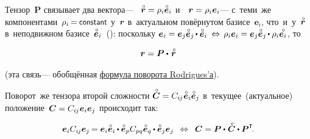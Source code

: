 \begin{otherlanguage}{russian}
\vspace{-0.4em}
Тензор~$\bm{P}$ связывает два вектора\:--- ~${\initiallocationvector = \rho_i \mathcircabove{\bm{e}}_i}$ и~~${\bm{r} = \rho_i \bm{e}_i}$\:--- с~теми~же компонентами~${\rho_i \hspace{-0.2ex} = \hspace{-0.1ex} \constant}$ у~$\bm{r}$ в~актуальном повёрнутом базисе~${\bm{e}_i}$, что~и~у~${\initiallocationvector}$ в~неподвижном базисе~${\mathcircabove{\bm{e}}_i}$~():
поскольку ${\bm{e}_i = \bm{e}_j \mathcircabove{\bm{e}}_j \hspace{-0.15ex} \dotp \mathcircabove{\bm{e}}_i \:\Leftrightarrow\, \rho_i \bm{e}_i = \bm{e}_j \mathcircabove{\bm{e}}_j \hspace{-0.15ex} \dotp \rho_i \mathcircabove{\bm{e}_i}}$, то

\nopagebreak\vspace{-0.25em}\begin{equation}\label{rodriguesrotationformula}
\locationvector = \bm{P} \dotp\hspace{.2ex} \initiallocationvector
\end{equation}

\vspace{-0.4em}\noindent
(эта связь\:--- обобщённая \href{https://fr.wikipedia.org/wiki/Rotation_vectorielle#Cas_g%C3%A9n%C3%A9ral}{формула поворота Rodrigues’а}).

\vspace{-0.1em}
Поворот~же тензора второй сложности ${\mathcircabove{\bm{C}} = C_{i\hspace{-0.1ex}j} \hspace{.1ex} \mathcircabove{\bm{e}}_i \mathcircabove{\bm{e}}_j}$ в~текущее~(актуальное) положение~${\bm{C} = C_{i\hspace{-0.1ex}j} \hspace{.1ex} \bm{e}_i \bm{e}_j}$ происходит так:

\nopagebreak\vspace{-0.25em}\begin{equation}
\bm{e}_i C_{i\hspace{-0.1ex}j} \bm{e}_j \hspace{-0.2ex}
= \bm{e}_i \mathcircabove{\bm{e}}_i \hspace{-0.1ex} \dotp \mathcircabove{\bm{e}}_p C_{pq} \mathcircabove{\bm{e}}_q \hspace{-0.1ex} \dotp \mathcircabove{\bm{e}}_j \bm{e}_j
\,\;\Leftrightarrow\;\:
\bm{C} = \bm{P} \dotp\hspace{.1ex} \mathcircabove{\bm{C}} \dotp \bm{P}^{\T}
\hspace{-0.32ex} .
\end{equation}

\end{otherlanguage}

